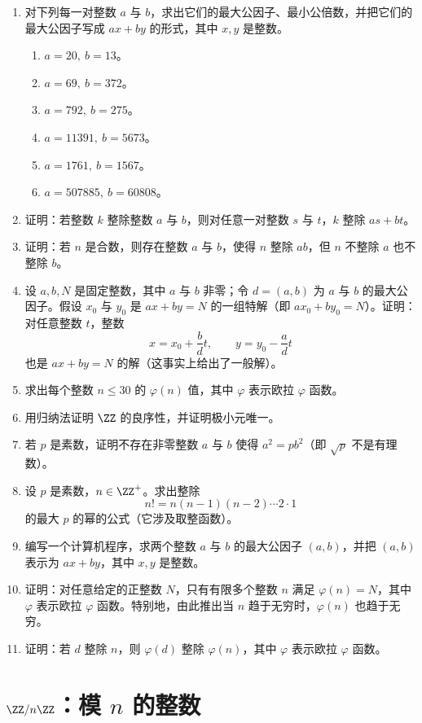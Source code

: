 \begin{enumerate}[label=\arabic*.]
  \item 对下列每一对整数 $a$ 与 $b$，求出它们的最大公因子、最小公倍数，并把它们的最大公因子写成 $ax+by$ 的形式，其中 $x,y$ 是整数。
  \begin{enumerate}[label=(\alph*)]
    \item $a=20,\ b=13$。
    \item $a=69,\ b=372$。
    \item $a=792,\ b=275$。
    \item $a=11391,\ b=5673$。
    \item $a=1761,\ b=1567$。
    \item $a=507885,\ b=60808$。
  \end{enumerate}
  \item 证明：若整数 $k$ 整除整数 $a$ 与 $b$，则对任意一对整数 $s$ 与 $t$，$k$ 整除 $as+bt$。
  \item 证明：若 $n$ 是合数，则存在整数 $a$ 与 $b$，使得 $n$ 整除 $ab$，但 $n$ 不整除 $a$ 也不整除 $b$。
  \item 设 $a,b,N$ 是固定整数，其中 $a$ 与 $b$ 非零；令 $d=(a,b)$ 为 $a$ 与 $b$ 的最大公因子。假设 $x_0$ 与 $y_0$ 是 $ax+by=N$ 的一组特解（即 $ax_0+by_0=N$）。证明：对任意整数 $t$，整数
  \[
    x=x_0+\frac{b}{d}t,\qquad y=y_0-\frac{a}{d}t
  \]
  也是 $ax+by=N$ 的解（这事实上给出了一般解）。
  \item 求出每个整数 $n\leq30$ 的 $\varphi(n)$ 值，其中 $\varphi$ 表示欧拉 $\varphi$ 函数。
  \item 用归纳法证明 $\ZZ$ 的良序性，并证明极小元唯一。
  \item 若 $p$ 是素数，证明不存在非零整数 $a$ 与 $b$ 使得 $a^2=pb^2$（即 $\sqrt{p}$ 不是有理数）。
  \item 设 $p$ 是素数，$n\in\ZZ^+$。求出整除
  \[
    n!=n(n-1)(n-2)\cdots 2\cdot1
  \]
  的最大 $p$ 的幂的公式（它涉及取整函数）。
  \item 编写一个计算机程序，求两个整数 $a$ 与 $b$ 的最大公因子 $(a,b)$，并把 $(a,b)$ 表示为 $ax+by$，其中 $x,y$ 是整数。
  \item 证明：对任意给定的正整数 $N$，只有有限多个整数 $n$ 满足 $\varphi(n)=N$，其中 $\varphi$ 表示欧拉 $\varphi$ 函数。特别地，由此推出当 $n$ 趋于无穷时，$\varphi(n)$ 也趋于无穷。
  \item 证明：若 $d$ 整除 $n$，则 $\varphi(d)$ 整除 $\varphi(n)$，其中 $\varphi$ 表示欧拉 $\varphi$ 函数。
\end{enumerate}

\section{$\ZZ/n\ZZ$：模 $n$ 的整数}

